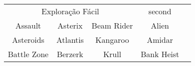 \begin{tabular}{cc|c||c|c}
	\multicolumn{3}{c||}{Exploração Fácil} & second     \\
	Assault     & Asterix  & Beam Rider    & Alien      \\
	Asteroids   & Atlantis & Kangaroo      & Amidar     \\
	Battle Zone & Berzerk  & Krull         & Bank Heist \\
\end{tabular}
